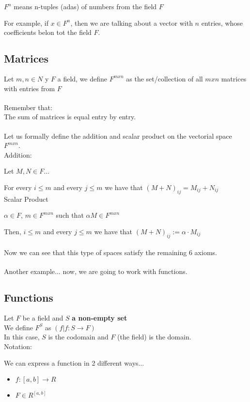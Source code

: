 \documentclass{article}
\begin{document}
\(F^n\) means n-tuples (adas) of numbers from the field \(F\)

For example, if \(x \in F^n\), then we are talking about a vector with \(n\) entries, whose coefficients belon tot the field \(F\).
\\
\subsection*{Matrices}
Let \(m,n \in N\) y \(F\) a field, we define \(F^{mxn}\) as the set/collection of all \(m x n\) matrices with entries from \(F\)
\\
\\
Remember that:
\\
The sum of matrices is equal entry by entry.
\\
\\
Let us formally define the addition and scalar product on the vectorial space \(F^{mxn}\).
\\

Addition:

Let \(M, N \in F\)...

For every \(i \leq m\) and every \(j \leq m\) we have that \((M + N)_{ij} = M_{ij} + N_{ij}\)
\\

Scalar Product

\(\alpha \in F\), \(m \in F^{mxn}\) such that \(\alpha M \in F^{mxn}\)

Then, \(i \leq m\) and every \(j \leq m\) we have that \((M + N)_{ij} := \alpha \cdot M_{ij}\)
\\
\\
Now we can see that this type of spaces satisfy the remaining 6 axioms.
\\
\\
Another example... now, we are going to work with functions.

\subsection*{Functions}
Let \(F\) be a field and \(S\) \textbf{a non-empty set}
\\
We define \(F^S\) as \((f | f: S \rightarrow F)\)
\\
In this case, \(S\) is the codomain and \(F\) (the field) is the domain.
\\

Notation:

We can express a function in 2 different ways...
\begin{itemize}
    \item \(f : [a,b] \rightarrow R\)
    \item \(F \in R^{[a,b]}\)
\end{itemize}
\end{document}
